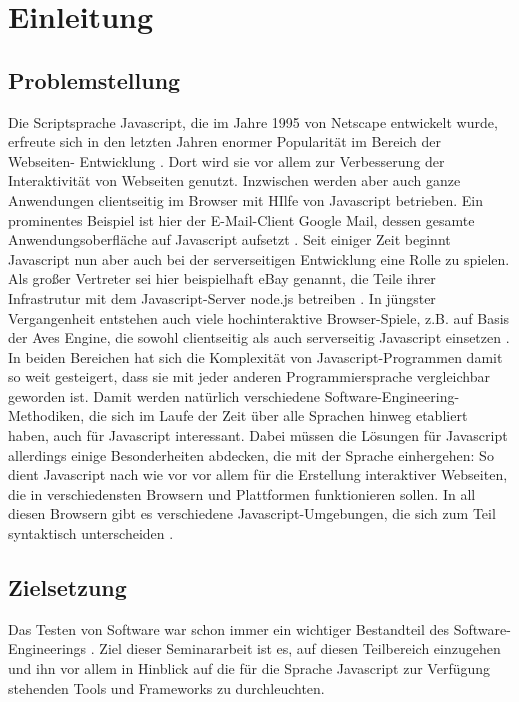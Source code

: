 \section{Einleitung}

\subsection{Problemstellung}

Die Scriptsprache Javascript, die im Jahre 1995 von Netscape entwickelt wurde, erfreute sich in den letzten Jahren enormer Popularität im Bereich der Webseiten- Entwicklung \citep[Vgl.][]{Wiki13-02}. Dort wird sie vor allem zur Verbesserung der Interaktivität von Webseiten genutzt. Inzwischen werden aber auch ganze Anwendungen clientseitig im Browser mit HIlfe von Javascript betrieben. Ein prominentes Beispiel ist hier der E-Mail-Client Google Mail, dessen gesamte Anwendungsoberfläche auf Javascript aufsetzt \citep[Vgl.][]{Google13-02}. Seit einiger Zeit beginnt Javascript nun aber auch bei der serverseitigen Entwicklung eine Rolle zu spielen. Als großer Vertreter sei hier beispielhaft eBay genannt, die Teile ihrer Infrastrutur mit dem Javascript-Server node.js betreiben \citep[Vgl.][]{Ebay11}. In jüngster Vergangenheit entstehen auch viele hochinteraktive Browser-Spiele, z.B. auf Basis der Aves Engine, die sowohl clientseitig als auch serverseitig Javascript einsetzen \citep[Vgl.][]{Ihlenfeld13}. In beiden Bereichen hat sich die Komplexität von Javascript-Programmen damit so weit gesteigert, dass sie mit jeder anderen Programmiersprache vergleichbar geworden ist. Damit werden natürlich verschiedene Software-Engineering-Methodiken, die sich im Laufe der Zeit über alle Sprachen hinweg etabliert haben, auch für Javascript interessant. Dabei müssen die Lösungen für Javascript allerdings einige Besonderheiten abdecken, die mit der Sprache einhergehen: So dient Javascript nach wie vor vor allem für die Erstellung interaktiver Webseiten, die in verschiedensten Browsern und Plattformen funktionieren sollen. In all diesen Browsern gibt es verschiedene Javascript-Umgebungen, die sich zum Teil syntaktisch unterscheiden \citep[Vgl.][S. 17 ff]{Kleivane11}.

\subsection{Zielsetzung}

Das Testen von Software war schon immer ein wichtiger Bestandteil des Software-Engineerings \citep[Vgl.][S. 1]{Kleivane11}. Ziel dieser Seminararbeit ist es, auf diesen Teilbereich einzugehen und ihn vor allem in Hinblick auf die für die Sprache Javascript zur Verfügung stehenden Tools und Frameworks zu durchleuchten.

